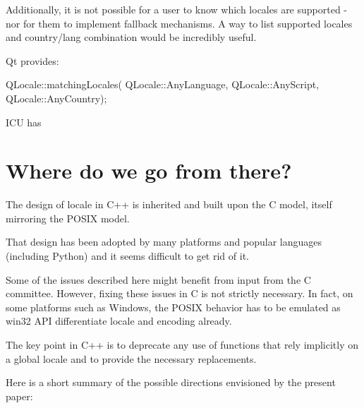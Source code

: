 \documentclass{wg21}
\begin{document}
Additionally, it is not possible for a user to know which locales are supported - nor for them to implement fallback mechanisms.
A way to list supported locales and country/lang combination would be incredibly useful. 

Qt provides:

\begin{codeblock}
    QLocale::matchingLocales( QLocale::AnyLanguage, QLocale::AnyScript, QLocale::AnyCountry);
\end{codeblock}

ICU has 


\section{Where do we go from there?}

The design of locale in C++ is inherited and built upon the C model, itself mirroring the POSIX model.

That design has been adopted by many platforms and popular languages (including Python) and it seems difficult to get rid of it.

Some of the issues described here might benefit from input from the C committee.
However, fixing these issues in C is not strictly necessary.
In fact, on some platforms such as Windows, the POSIX behavior has to be emulated as win32 API differentiate locale and encoding already.

The key point in C++ is to deprecate any use of functions that rely implicitly on a global locale and to provide the necessary replacements.

Here is a short summary of the possible directions envisioned by the present paper:
\end{document}
